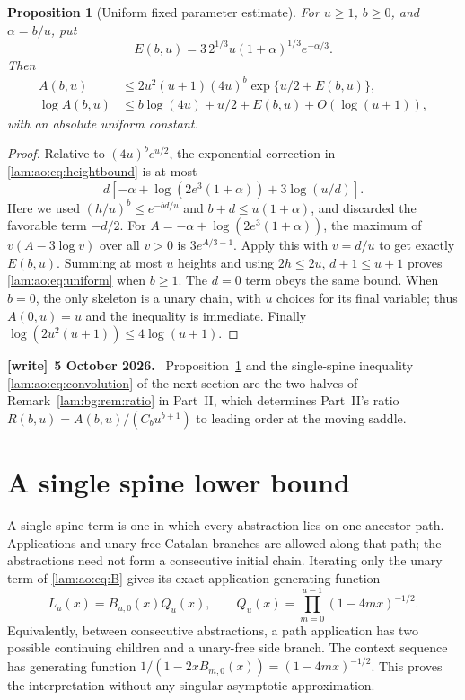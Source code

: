 \documentclass[11pt,a4paper]{article}
\numberwithin{equation}{section}
\newtheorem{proposition}[theorem]{Proposition}
\theoremstyle{remark}
\newenvironment{writenote}[1][]{\par\smallskip\begingroup\small
 \noindent\textbf{[write]}\if\relax\detokenize{#1}\relax\else~\textbf{#1.}\fi\ }%
 {\par\endgroup\smallskip}
\begin{document}
\begin{proposition}[Uniform fixed parameter estimate]\label{lam:ao:prop:upper}
For $u\ge1$, $b\ge0$, and $\alpha=b/u$, put
\begin{equation}\label{lam:ao:eq:E}
 E(b,u)=3\,2^{1/3}u(1+\alpha)^{1/3}e^{-\alpha/3}.
\end{equation}
Then
\begin{align}
 A(b,u)&\le2u^2(u+1)(4u)^b\exp\{u/2+E(b,u)\},\label{lam:ao:eq:uniform}\\
 \log A(b,u)&\le b\log(4u)+u/2+E(b,u)+O(\log(u+1)),\label{lam:ao:eq:loguniform}
\end{align}
with an absolute uniform constant.
\end{proposition}
\begin{proof}
Relative to $(4u)^be^{u/2}$, the exponential correction in \eqref{lam:ao:eq:heightbound} is at most
\[
 d\left[-\alpha+\log(2e^3(1+\alpha))+3\log(u/d)\right].
\]
Here we used $(h/u)^b\le e^{-bd/u}$ and $b+d\le u(1+\alpha)$, and discarded the favorable term $-d/2$. For $A=-\alpha+\log(2e^3(1+\alpha))$, the maximum of $v(A-3\log v)$ over all $v>0$ is $3e^{A/3-1}$. Apply this with $v=d/u$ to get exactly $E(b,u)$. Summing at most $u$ heights and using $2h\le2u$, $d+1\le u+1$ proves \eqref{lam:ao:eq:uniform} when $b\ge1$. The $d=0$ term obeys the same bound. When $b=0$, the only skeleton is a unary chain, with $u$ choices for its final variable; thus $A(0,u)=u$ and the inequality is immediate. Finally $\log(2u^2(u+1))\le4\log(u+1)$.
\end{proof}
\begin{writenote}[5 October 2026]
Proposition~\ref{lam:ao:prop:upper} and the single-spine inequality \eqref{lam:ao:eq:convolution} of the next section are the two halves of Remark~\ref{lam:bg:rem:ratio} in Part~II, which determines Part~II's ratio $R(b,u)=A(b,u)/(C_bu^{b+1})$ to leading order at the moving saddle.
\end{writenote}

\section{A single spine lower bound}\label{lam:ao:sec:lower}
A single-spine term is one in which every abstraction lies on one ancestor path. Applications and unary-free Catalan branches are allowed along that path; the abstractions need not form a consecutive initial chain. Iterating only the unary term of \eqref{lam:ao:eq:B} gives its exact application generating function
\begin{equation}\label{lam:ao:eq:spine}
 L_u(x)=B_{u,0}(x)Q_u(x),\qquad
 Q_u(x)=\prod_{m=0}^{u-1}(1-4mx)^{-1/2}.
\end{equation}
Equivalently, between consecutive abstractions, a path application has two possible continuing children and a unary-free side branch. The context sequence has generating function
$1/(1-2xB_{m,0}(x))=(1-4mx)^{-1/2}$. This proves the interpretation without any singular asymptotic approximation.
\end{document}
